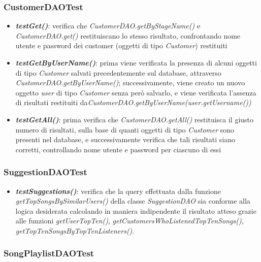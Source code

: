 \documentclass{article}
\begin{document}
  \subsubsection{CustomerDAOTest}
  \begin{itemize}

    \item \textbf{\textit{testGet()}}: verifica che \textit{CustomerDAO.getByStageName()} e \textit{CustomerDAO.get()} restituiscano lo stesso risultato, confrontando nome utente e password dei customer (oggetti di tipo \textit{Customer}) restituiti

    \item \textbf{\textit{testGetByUserName()}}: prima viene verificata la presenza di alcuni oggetti di tipo \textit{Customer} salvati precedentemente sul database, attraverso \textit{CustomerDAO.getByUserName()}; successivamente, viene creato un nuovo oggetto \textit{user} di tipo \textit{Customer} senza però salvarlo, e viene verificata l'assenza di risultati restituiti da\textit{CustomerDAO.getByUserName(user.getUsername())}

    \item \textbf{\textit{testGetAll()}}: prima verifica che \textit{CustomerDAO.getAll()} restituisca il giusto numero di risultati, sulla base di quanti oggetti di tipo \textit{Customer} sono presenti nel database, e successivamente verifica che tali risultati siano corretti, controllando nome utente e password per ciascuno di essi

  \end{itemize}


  \subsubsection{SuggestionDAOTest}
  \begin{itemize}
    \item
    \textbf{\textit{testSuggestions()}}: verifica che la query effettuata dalla funzione
    \textit{getTopSongsBySimilarUsers()} della classe \textit{SuggestionDAO} sia conforme alla logica desiderata
    calcolando in maniera indipendente il risultato atteso grazie alle funzioni \textit{getUserTopTen()},
    \textit{getCustomersWhoListenedTopTenSongs()}, \textit{getTopTenSongsByTopTenListeners()}.
  \end{itemize}

  \subsubsection{SongPlaylistDAOTest}
\end{document}
